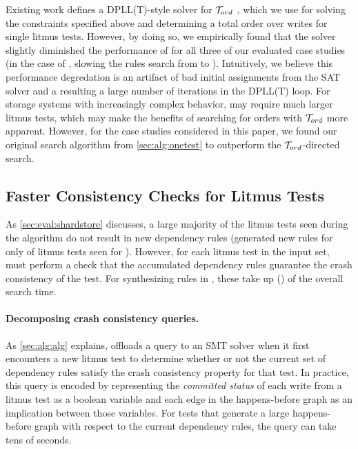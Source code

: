 Existing work defines a DPLL(T)-style solver for $\mathcal{T}_{ord}$ \cite{n:tord},
which we use for solving the constraints specified above and
determining a total order over writes for single litmus tests.
However, by doing so, we empirically found that the solver
slightly diminished the performance of \depsynth for all three of our evaluated case studies
(in the case of \shardstore, slowing the rules search from
\shardstoresynthesistime to \shardstoresynthesistimetord).
Intuitively, we believe this performance degredation is an artifact of 
bad initial assignments from the SAT solver
and a resulting a large number of iterations in the DPLL(T) loop.
For storage systems with increasingly complex behavior,
\depsynth may require much larger litmus tests,
which may make the benefits of searching for orders with $\mathcal{T}_{ord}$ more apparent.
However, for the case studies considered in this paper,
we found our original search algorithm from \cref{sec:alg:onetest}
to outperform the $\mathcal{T}_{ord}$-directed search.

\subsection{Faster Consistency Checks for Litmus Tests}
\label{s:improved-search}
As \cref{sec:eval:shardstore} discusses,
a large majority of the litmus tests seen during the \depsynth
algorithm do not result in new dependency rules
(\depsynth generated new rules for only \shardstoretestsused of \shardstoreinputtests
 litmus tests seen for \shardstore).
However, for each litmus test in the input set, \depsynth
must perform a check that the accumulated dependency rules
guarantee the crash consistency of the test.
For synthesizing rules in \shardstore,
these take up \shardstoreverificationminutes (\shardstoreverificationpercent)
of the overall search time.

\paragraph{Decomposing crash consistency queries.}
As \cref{sec:alg:alg} explains, \depsynth offloads a query to an SMT
solver when it first encounters a new litmus test to determine
whether or not the current set of dependency rules satisfy the
crash consistency property for that test.
In practice, this query is encoded by representing the \textit{committed status}
of each write from a litmus test as a boolean variable
and each edge in the happens-before graph as an implication between those variables.
For tests that generate a large happens-before graph
with respect to the current dependency rules,
the query can take tens of seconds.

